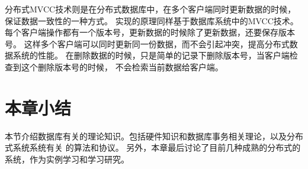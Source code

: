 分布式MVCC技术则是在分布式数据库中，在多个客户端同时更新数据的时候，保证数据一致性的一种方式。
实现的原理同样基于数据库系统中的MVCC技术。
每个客户端操作都有一个版本号，更新数据的时候除了更新数据，还要保存版本号。
这样多个客户端可以同时更新同一份数据，而不会引起冲突，提高分布式数据系统的性能。
在删除数据的时候，只是简单的记录下删除版本号，当客户端检查到这个删除版本号的时候，
不会检索当前数据给客户端。
\section{本章小结}
本节介绍数据库有关的理论知识。包括硬件知识和数据库事务相关理论，以及分布式系统系统有关
的算法和协议。
另外，本章最后讨论了目前几种成熟的分布式的系统，作为实例学习和学习研究。